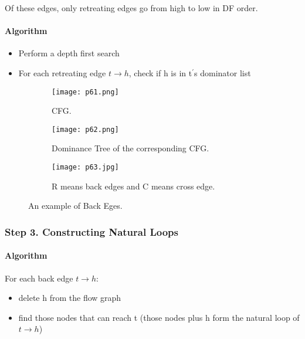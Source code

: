 Of these edges, only retreating edges go from high to low in DF order.



\paragraph{Algorithm}

\begin{itemize}
    \item Perform a depth first search
    \item For each retreating edge \(t \rightarrow h\), check if h is in t$^\prime$s dominator list
\end{itemize}


\begin{figure}[H]
    \centering
    \begin{subfigure}{0.3\textwidth}
    \centering
        \texttt{[image: p61.png]}
        \caption{CFG.}
        \label{fig:p61}
    \end{subfigure}
    \begin{subfigure}{0.3\textwidth}
    \centering
        \texttt{[image: p62.png]}
        \caption{Dominance Tree of the corresponding CFG.}
        \label{fig:p62}
    \end{subfigure}
    \begin{subfigure}{0.3\textwidth}
        \centering
            \texttt{[image: p63.jpg]}
            \caption{{\color{red} R} means back edges and {\color{orange} C} means cross edge.}
            \label{fig:p62}
        \end{subfigure}
    \caption{An example of Back Eges.}
       \label{fig:p51-58}
\end{figure}

\subsubsection{Step 3. Constructing Natural Loops}

\paragraph{Algorithm} For each back edge $t\rightarrow h$:

\begin{itemize}
    \item delete h from the flow graph
    \item find those nodes that can reach t
(those nodes plus h form the natural loop of \(t \rightarrow h\))
\end{itemize}

